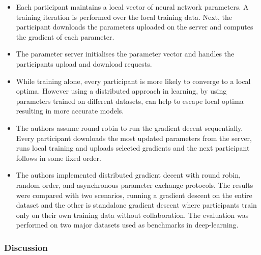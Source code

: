 \begin{itemize}

	\item Each participant maintains a local vector of neural network parameters. A training iteration
	is performed over the local training data. Next, the participant downloads the parameters uploaded 
	on the server and computes the gradient of each parameter. 
	
	\item The parameter server initialises the parameter vector and handles the participants upload and 
	download requests. 
	
	\item While training alone, every participant is more likely 
	to converge to a local optima. However using a distributed approach in learning, by using parameters
	trained on different datasets, can help to escape local optima resulting in more accurate models. 
	
	\item The authors assume round robin to run the gradient decent 
	sequentially. Every participant downloads the most updated parameters from the server, runs local 
	training and uploads selected gradients and the next participant follows in some fixed order. 
	
	\item The authors implemented distributed gradient decent with round robin, random order, and 
	asynchronous parameter exchange protocols. The results were compared with two scenarios, running 
	a gradient descent on the entire dataset and the other is standalone gradient descent where participants 
	train only on their own training data without collaboration. The evaluation was performed on two major 
	datasets used as benchmarks in deep-learning. 
	
\end{itemize}

\subsubsection*{Discussion} 

